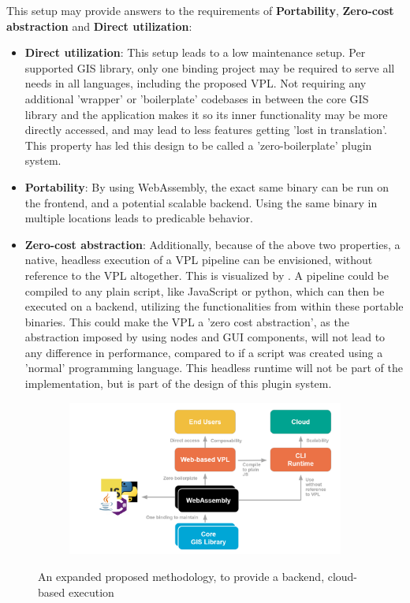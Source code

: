 This setup may provide answers to the requirements of \textbf{Portability}, \textbf{Zero-cost abstraction} and \textbf{Direct utilization}:
\begin{itemize}
  \item \textbf{Direct utilization}: This setup leads to a low maintenance setup. 
  Per supported \ac{GIS} library, only one binding project may be required to serve all needs in all languages, including the proposed VPL. 
  Not requiring any additional 'wrapper' or 'boilerplate' codebases in between the core GIS library and the application makes it so its inner functionality may be more directly accessed, and may lead to less features getting 'lost in translation'.
  This property has led this design to be called a 'zero-boilerplate' plugin system. 

  \item \textbf{Portability}: By using WebAssembly, the exact same binary can be run on the frontend, and a potential scalable backend. 
  Using the same binary in multiple locations leads to predicable behavior. 

  \item \textbf{Zero-cost abstraction}: Additionally, because of the above two properties, a native, headless execution of a VPL pipeline can be envisioned, without reference to the VPL altogether.
  This is visualized by .
  A pipeline could be compiled to any plain script, like JavaScript or python, which can then be executed on a backend, utilizing the functionalities from within these portable binaries. 
  This could make the VPL a 'zero cost abstraction', as the abstraction imposed by using nodes and \ac{GUI} components, will not lead to any difference in performance, compared to if a script was created using a 'normal' programming language.
  This headless runtime will not be part of the implementation, but is part of the design of this plugin system.
\end{itemize}

\begin{figure}
  \centering
  \begin{subfigure}[b]{0.80\linewidth}
    \centering
    \graphicspath{{../../assets/images/1/}}
    \includegraphics[width=\linewidth]{expanded-proposal.png}
  \end{subfigure}%
  \caption{An expanded proposed methodology, to provide a backend, cloud-based execution}
  \label{fig:proposal-extended}
\end{figure}

